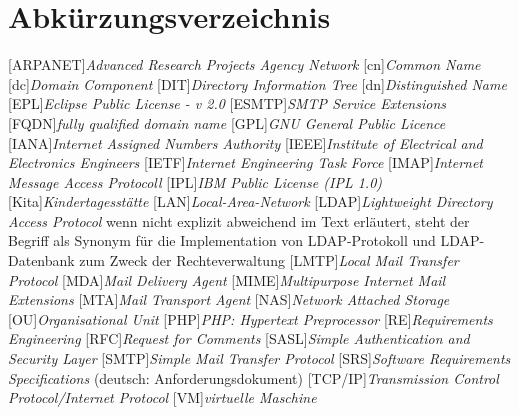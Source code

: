 
\chapter*{Abkürzungsverzeichnis}

\begin{acronym}
[ARPANET]{\textit{Advanced Research Projects Agency Network}}
[cn]{\textit{Common Name}}
[dc]{\textit{Domain Component}}
[DIT]{\textit{Directory Information Tree}}
[dn]{\textit{Distinguished Name}}
[EPL]{\textit{Eclipse Public License - v 2.0}}
[ESMTP]{\textit{SMTP Service Extensions}}
[FQDN]{\textit{fully qualified domain name}}
[GPL]{\textit{GNU General Public Licence}}
[IANA]{\textit{Internet Assigned Numbers Authority}}
[IEEE]{\textit{Institute of Electrical and Electronics Engineers}}
[IETF]{\textit{Internet Engineering Task Force}}
[IMAP]{\textit{Internet Message Access Protocoll}}
[IPL]{\textit{IBM Public License (IPL 1.0)}}
[Kita]{\textit{Kindertagesstätte}}
[LAN]{\textit{Local-Area-Network}}
[LDAP]{\textit{Lightweight Directory Access Protocol}}
wenn nicht explizit abweichend im Text erläutert, steht der Begriff als Synonym für die Implementation von LDAP-Protokoll und LDAP-Datenbank zum Zweck der Rechteverwaltung
[LMTP]{\textit{Local Mail Transfer Protocol}}
[MDA]{\textit{Mail Delivery Agent}}
[MIME]{\textit{Multipurpose Internet Mail Extensions}}
[MTA]{\textit{Mail Transport Agent}}
[NAS]{\textit{Network Attached Storage}}
[OU]{\textit{Organisational Unit}}
[PHP]{\textit{PHP: Hypertext Preprocessor}}
[RE]{\textit{Requirements Engineering}}
[RFC]{\textit{Request for Comments}}
[SASL]{\textit{Simple Authentication and Security Layer}}
[SMTP]{\textit{Simple Mail Transfer Protocol}}
[SRS]{\textit{Software Requirements Specifications}} 
(deutsch: Anforderungsdokument)
[TCP/IP]{\textit{Transmission Control Protocol/Internet Protocol}}
[VM]{\textit{virtuelle Maschine}}
\end{acronym}